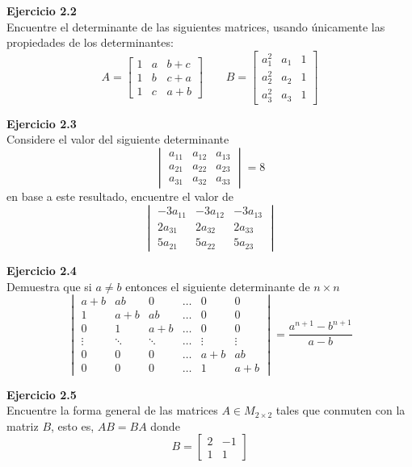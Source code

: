 \documentclass{article}
\newenvironment{problem}[2][Ejercicio]
    { \begin{mdframed}[backgroundcolor=gray!20] \textbf{#1 #2} \\}
    {  \end{mdframed}}
\begin{document}
\begin{problem}{2.2}
Encuentre el determinante de las siguientes matrices, usando únicamente las propiedades de los determinantes:
\[
A = \begin{bmatrix}
1 & a & b+c \\
1 & b & c+a \\
1 & c & a+b
\end{bmatrix} \ \ \ \ \ \ \ \ \
B = \begin{bmatrix}
a_1^2 & a_1 & 1 \\
a_2^2 & a_2 & 1 \\
a_3^2 & a_3 & 1
\end{bmatrix}
\]
\end{problem}
\newpage
\begin{problem}{2.3}	
    Considere el valor del siguiente determinante
\[
\begin{vmatrix}
a_{11} & a_{12} & a_{13} \\
a_{21} & a_{22} & a_{23} \\
a_{31} & a_{32} & a_{33} 
\end{vmatrix} = 8
\]
en base a este resultado, encuentre el valor de
\[
\begin{vmatrix}
-3a_{11} & -3a_{12} & -3a_{13} \\
2a_{31} & 2a_{32} & 2a_{33} \\
5a_{21} & 5a_{22} & 5a_{23}
\end{vmatrix}
\]
\end{problem}
\begin{problem}{2.4}
    
    Demuestra que si $a\neq b$ entonces el siguiente determinante de $n\times n$
    \[
    \begin{vmatrix}
    a+ b & ab & 0 & \dots & 0 & 0 \\
    1 & a+b & ab & \dots & 0 & 0 \\
    0 & 1 & a+b & \dots & 0 & 0 \\
    \vdots & \ddots & \ddots & \dots & \vdots & \vdots \\
    0 & 0 & 0 & \dots & a+b & ab \\
    0 & 0 & 0 & \dots & 1 & a+b
    \end{vmatrix} =
    \frac{a^{n+1}-b^{n+1}}{a-b}
    \]
\end{problem}

\begin{problem}{2.5}
    Encuentre la forma general de las matrices $A \in M_{2\times 2}$ tales que conmuten con la matriz $B$, esto es, $AB = BA$ donde
\[
B = \begin{bmatrix}
2 & -1 \\
1 & 1
\end{bmatrix}
\]
\end{problem}
\end{document}
